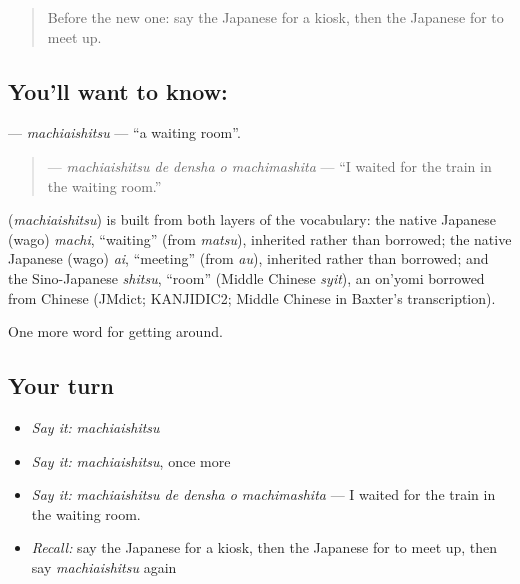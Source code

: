 \label{lesson:JA-C372-machiaishitsu}



\begin{quote}
Before the new one: say the Japanese for a kiosk, then the Japanese for to meet up.
\end{quote}

\subsection*{You'll want to know: }
\textbf{} — \emph{machiaishitsu} — \textquotedblleft{}a waiting room\textquotedblright{}.

\begin{quote}
\textbf{  } — \emph{machiaishitsu de densha o machimashita} — \textquotedblleft{}I waited for the train in the waiting room.\textquotedblright{}
\end{quote}

\begin{cousinweb}
\textbf{} (\emph{machiaishitsu}) is built from both layers of the vocabulary: the native Japanese (wago) \emph{machi}, \textquotedblleft{}waiting\textquotedblright{} (from \emph{matsu}), inherited rather than borrowed; the native Japanese (wago) \emph{ai}, \textquotedblleft{}meeting\textquotedblright{} (from \emph{au}), inherited rather than borrowed; and the Sino-Japanese \emph{shitsu}, \textquotedblleft{}room\textquotedblright{} (Middle Chinese \emph{syit}), an on'yomi borrowed from Chinese (JMdict; KANJIDIC2; Middle Chinese in Baxter's transcription).
\end{cousinweb}

\begin{grammarlens}[title={What you've built}]
One more word for getting around.
\end{grammarlens}

\subsection*{Your turn}
\begin{itemize}
\raggedright
  \item \emph{Say it:} \emph{machiaishitsu}
  \item \emph{Say it:} \emph{machiaishitsu}, once more
  \item \emph{Say it:} \emph{machiaishitsu de densha o machimashita} — I waited for the train in the waiting room.
  \item \emph{Recall:} say the Japanese for a kiosk, then the Japanese for to meet up, then say \emph{machiaishitsu} again
\end{itemize}


